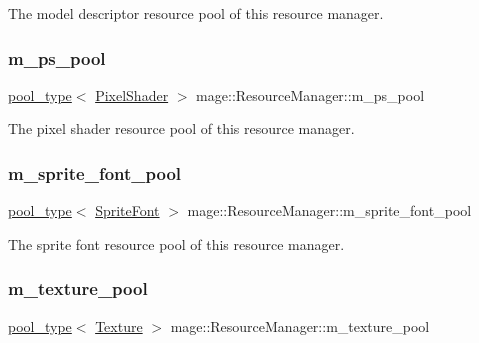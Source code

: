 The model descriptor resource pool of this resource manager. \hypertarget{classmage_1_1_resource_manager_ad42cd06ff92906685055f9374366136f}{}\label{classmage_1_1_resource_manager_ad42cd06ff92906685055f9374366136f} 
\subsubsection{\texorpdfstring{m\+\_\+ps\+\_\+pool}{m\_ps\_pool}}
{\footnotesize\ttfamily \hyperlink{classmage_1_1_resource_manager_a4416f0a710790d8aa2d0bc006764695a}{pool\+\_\+type}$<$ \hyperlink{namespacemage_a27ecaf266420ee7a494d64edc0757129}{Pixel\+Shader} $>$ mage\+::\+Resource\+Manager\+::m\+\_\+ps\+\_\+pool\hspace{0.3cm}{\ttfamily [private]}}

The pixel shader resource pool of this resource manager. \hypertarget{classmage_1_1_resource_manager_a17287590aebff7d1f345dd83af5980fd}{}\label{classmage_1_1_resource_manager_a17287590aebff7d1f345dd83af5980fd} 
\subsubsection{\texorpdfstring{m\+\_\+sprite\+\_\+font\+\_\+pool}{m\_sprite\_font\_pool}}
{\footnotesize\ttfamily \hyperlink{classmage_1_1_resource_manager_a4416f0a710790d8aa2d0bc006764695a}{pool\+\_\+type}$<$ \hyperlink{classmage_1_1_sprite_font}{Sprite\+Font} $>$ mage\+::\+Resource\+Manager\+::m\+\_\+sprite\+\_\+font\+\_\+pool\hspace{0.3cm}{\ttfamily [private]}}

The sprite font resource pool of this resource manager. \hypertarget{classmage_1_1_resource_manager_a28913331d5e5ac747df30c058c9263c4}{}\label{classmage_1_1_resource_manager_a28913331d5e5ac747df30c058c9263c4} 
\subsubsection{\texorpdfstring{m\+\_\+texture\+\_\+pool}{m\_texture\_pool}}
{\footnotesize\ttfamily \hyperlink{classmage_1_1_resource_manager_a4416f0a710790d8aa2d0bc006764695a}{pool\+\_\+type}$<$ \hyperlink{classmage_1_1_texture}{Texture} $>$ mage\+::\+Resource\+Manager\+::m\+\_\+texture\+\_\+pool\hspace{0.3cm}{\ttfamily [private]}}

